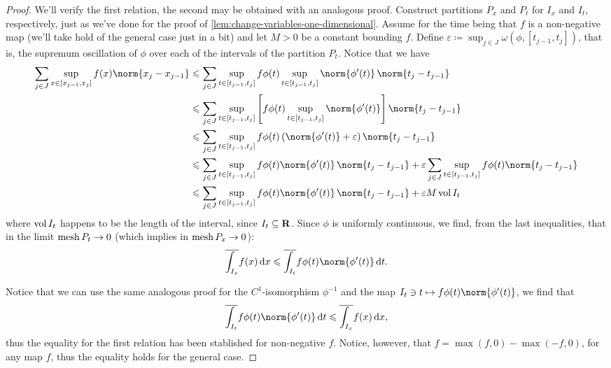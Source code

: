 \begin{proof}
We'll verify the first relation, the second may be obtained with an analogous
proof. Construct partitions \(P_x\) and \(P_t\) for \(I_x\) and \(I_t\),
respectively, just as we've done for the proof of
\cref{lem:change-variables-one-dimensional}. Assume for the time being that
\(f\) is a non-negative map (we'll take hold of the general case just in a
bit) and let \(M > 0\) be a constant bounding \(f\). Define \(\varepsilon
\coloneq \sup_{j \in J} \omega(\phi, [t_{j-1}, t_j])\), that is, the supremum
oscillation of \(\phi\) over each of the intervals of the partition
\(P_t\). Notice that we have
\begin{align*}
  \sum_{j \in J} \sup_{x \in [x_{j-1}, x_j]} f(x) \norm{x_j - x_{j-1}}
  &\leq \sum_{j \in J} \sup_{t \in [t_{j-1}, t_j]} f \phi(t)
    \sup_{t \in [t_{j-1}, t_j]} \norm{\phi'(t)}\, \norm{t_j - t_{j-1}} \\
  &\leq \sum_{j \in J} \sup_{t \in [t_{j-1}, t_j]}
    \left[
    f \phi(t) \sup_{t \in [t_{j-1}, t_j]} \norm{\phi'(t)}
    \right]
    \norm{t_j - t_{j-1}} \\
  &\leq \sum_{j \in J} \sup_{t \in [t_{j-1}, t_j]}
    f \phi(t) \left( \norm{\phi'(t)} + \varepsilon \right)
    \norm{t_j - t_{j-1}} \\
  &\leq \sum_{j \in J} \sup_{t \in [t_{j-1}, t_j]}
    f \phi(t) \norm{\phi'(t)}\, \norm{t_j - t_{j-1}}
    + \varepsilon \sum_{j \in J} \sup_{t \in [t_{j-1}, t_j]}
    f\phi(t) \norm{t_j - t_{j-1}} \\
  &\leq \sum_{j \in J} \sup_{t \in [t_{j-1}, t_j]}
    f \phi(t) \norm{\phi'(t)}\, \norm{t_j - t_{j-1}}
    + \varepsilon M \Vol I_t
\end{align*}
where \(\operatorname{vol} I_t\) happens to be the length of the interval, since \(I_t
\subseteq \mathbf{R}\). Since \(\phi\) is uniformly continuous, we find, from the last
inequalities, that in the limit \(\operatorname{mesh} P_t \to 0\) (which implies in \(\operatorname{mesh}
P_x \to 0\)):
\[
  \overline{\int_{I_x}} f(x)\, \diff x
  \leq \overline{\int_{I_t}} f \phi(t) \norm{\phi'(t)}\, \diff t.
\]

Notice that we can use the same analogous proof for the \(C^1\)-isomorphism
\(\phi^{-1}\) and the map \(I_t \ni t \mapsto f \phi(t) \norm{\phi'(t)}\), we
find that
\[
  \overline{\int_{I_t}} f \phi(t) \norm{\phi'(t)}\, \diff t
  \leq \overline{\int_{I_x}} f(x)\, \diff x,
\]
thus the equality for the first relation has been stablished for non-negative
\(f\). Notice, however, that \(f = \max(f, 0) - \max(-f, 0)\), for any map
\(f\), thus the equality holds for the general case.
\end{proof}

